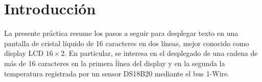 %
%


\section{Introducción}%
\label{sec:introduction}
La presente práctica resume los pasos a seguir para desplegar texto en una pantalla de cristal líquido de 16 caracteres en dos líneas, mejor conocido como display LCD \(16\times2\).
En particular, se interesa en el desplegado de una cadena de más de 16 caracteres en la primera ĺínea del display y en la segunda la temperatura registrada por un sensor DS18B20 mediante el bus 1-Wire.




